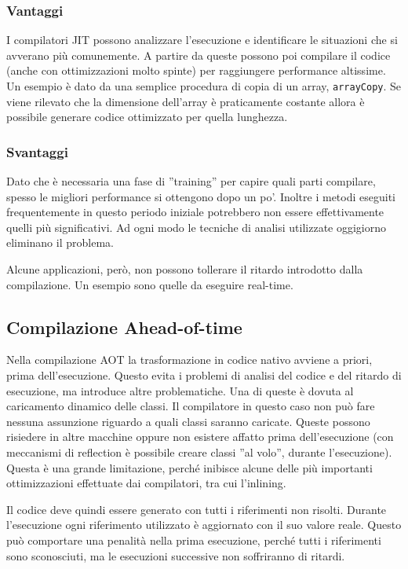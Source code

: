 \subsubsection{Vantaggi}
I compilatori JIT possono analizzare l'esecuzione e identificare le situazioni che si avverano più comunemente. A partire da queste possono poi compilare il codice (anche con ottimizzazioni molto spinte) per raggiungere performance altissime. Un esempio è dato da una semplice procedura di copia di un array, \texttt{arrayCopy}. Se viene rilevato che la dimensione dell'array è praticamente costante allora è possibile generare codice ottimizzato per quella lunghezza. 

\subsubsection{Svantaggi}
Dato che è necessaria una fase di ''training'' per capire quali parti compilare, spesso le migliori performance si ottengono dopo un po'. Inoltre i metodi eseguiti frequentemente in questo periodo iniziale potrebbero non essere effettivamente quelli più significativi. Ad ogni modo le tecniche di analisi utilizzate oggigiorno eliminano il problema. 

Alcune applicazioni, però, non possono tollerare il ritardo introdotto dalla compilazione. Un esempio sono quelle da eseguire real-time.

\subsection{Compilazione Ahead-of-time}
Nella compilazione AOT la trasformazione in codice nativo avviene a priori, prima dell'esecuzione. Questo evita i problemi di analisi del codice e del ritardo di esecuzione, ma introduce altre problematiche. Una di queste è dovuta al caricamento dinamico delle classi. Il compilatore in questo caso non può fare nessuna assunzione riguardo a quali classi saranno caricate. Queste possono risiedere in altre macchine oppure non esistere affatto prima dell'esecuzione (con meccanismi di reflection è possibile creare classi ''al volo'', durante l'esecuzione). Questa è una grande limitazione, perché inibisce alcune delle più importanti ottimizzazioni effettuate dai compilatori, tra cui l'inlining. 

Il codice deve quindi essere generato con tutti i riferimenti non risolti. Durante l'esecuzione ogni riferimento utilizzato è aggiornato con il suo valore reale. Questo può comportare una penalità nella prima esecuzione, perché tutti i riferimenti sono sconosciuti, ma le esecuzioni successive non soffriranno di ritardi.

